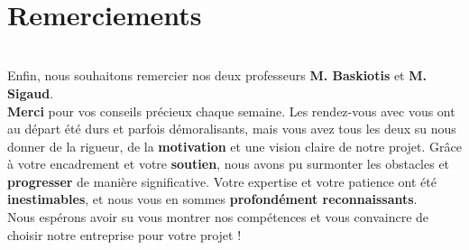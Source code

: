 \documentclass[12pt]{article}
\begin{document}
\\

\clearpage
\section*{Remerciements}
\\

Enfin, nous souhaitons remercier nos deux professeurs \textbf{M. Baskiotis} et \textbf{M. Sigaud}.\textbf{} \\

\hspace{\parindent}\textbf{Merci} pour vos conseils précieux chaque semaine. Les rendez-vous avec vous ont au départ été durs et parfois démoralisants, mais vous avez tous les deux su nous donner de la rigueur, de la \textbf{motivation} et une vision claire de notre projet. Grâce à votre encadrement et votre \textbf{soutien}, nous avons pu surmonter les obstacles et \textbf{progresser }de manière significative. Votre expertise et votre patience ont été \textbf{inestimables}, et nous vous en sommes \textbf{profondément reconnaissants}. 
\\
Nous espérons avoir su vous montrer nos compétences et vous convaincre de choisir notre entreprise pour votre projet !



\\
\end{document}
